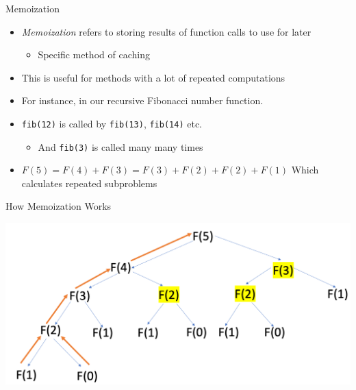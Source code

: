 \documentclass[
  ignorenonframetext,
]{beamer}
\providecommand{\tightlist}{%
  \setlength{\itemsep}{0pt}\setlength{\parskip}{0pt}}\usepackage{longtable,booktabs,array}
\begin{document}
\begin{frame}[fragile]{Memoization}
\protect\hypertarget{memoization}{}
\begin{itemize}
\item
  \emph{Memoization} refers to storing results of function calls to use
  for later

  \begin{itemize}
  \tightlist
  \item
    Specific method of caching
  \end{itemize}
\item
  This is useful for methods with a lot of repeated computations
\item
  For instance, in our recursive Fibonacci number function.
\item
  \texttt{fib(12)} is called by \texttt{fib(13)}, \texttt{fib(14)} etc.

  \begin{itemize}
  \tightlist
  \item
    And \texttt{fib(3)} is called many many times
  \end{itemize}
\item
  \(F(5) = F(4) + F(3) = F(3) + F(2) + F(2) + F(1)\) Which calculates
  repeated subproblems
\end{itemize}
\end{frame}

\begin{frame}{How Memoization Works}
\protect\hypertarget{how-memoization-works}{}

\includegraphics[width=13.33333in,height=\textheight]{images/memo.png}
\end{frame}
\end{document}
